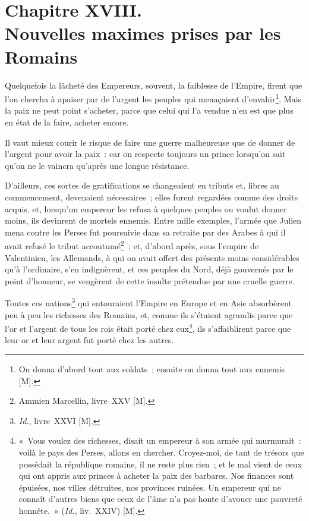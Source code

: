 \documentclass[french,twoside]{book} %
\newcommand\chapteropen{} %
\newcommand\chaptercont{} %
\begin{document}
\chapteropen
\chapter[{Chapitre XVIII. Nouvelles maximes prises par les Romains}]{Chapitre XVIII. \\
Nouvelles maximes prises par les Romains}
\label{considérations\_Romains\_chap\_18}\renewcommand{\leftmark}{Chapitre XVIII. \\
Nouvelles maximes prises par les Romains}


\chaptercont
\noindent Quelquefois la lâcheté des Empereurs, souvent, la faiblesse de l’Empire, firent que l’on chercha à apaiser par de l’argent les peuples qui menaçaient d’envahir\footnote{On donna d’abord tout aux soldats ; ensuite on donna tout aux ennemis [M].}. Mais la paix ne peut point s’acheter, parce que celui qui l’a vendue n’en est que plus en état de la faire, acheter encore.\par
Il vaut mieux courir le risque de faire une guerre malheureuse que de donner de l’argent pour avoir la paix : car on respecte toujours un prince lorsqu’on sait qu’on ne le vaincra qu’après une longue résistance.\par
D’ailleurs, ces sortes de gratifications se changeaient en tributs et, libres au commencement, devenaient nécessaires ; elles furent regardées comme des droits acquis, et, lorsqu’un empereur les refusa à quelques peuples ou voulut donner moins, ils devinrent de mortels ennemis. Entre mille exemples, l’armée que Julien mena contre les Perses fut poursuivie dans sa retraite par des Arabes à qui il avait refusé le tribut accoutumé\footnote{Ammien Marcellin, livre XXV [M].} ; et, d’abord après, sous l’empire de Valentinien, les Allemands, à qui on avait offert des présents moins considérables qu’à l’ordinaire, s’en indignèrent, et ces peuples du Nord, déjà gouvernés par le point d’honneur, se vengèrent de cette insulte prétendue par une cruelle guerre.\par
Toutes ces nations\footnote{{\itshape Id.}, livre XXVI [M].} qui entouraient l’Empire en Europe et en Asie absorbèrent peu à peu les richesses des Romains, et, comme ils s’étaient agrandis parce que l’or et l’argent de tous les rois était porté chez eux\footnote{« Vous voulez des richesses, disait un empereur à son armée qui murmurait : voilà le pays des Perses, allons en chercher. Croyez-moi, de tant de trésors que possédait la république romaine, il ne reste plus rien ; et le mal vient de ceux qui ont appris aux princes à acheter la paix des barbares. Nos finances sont épuisées, nos villes détruites, nos provinces ruinées. Un empereur qui ne connaît d’autres biens que ceux de l’âme n’a pas honte d’avouer une pauvreté honnête. » ({\itshape Id.}, liv. XXIV) [M].}, ils s’affaiblirent parce que leur or et leur argent fut porté chez les autres.\par
\end{document}
